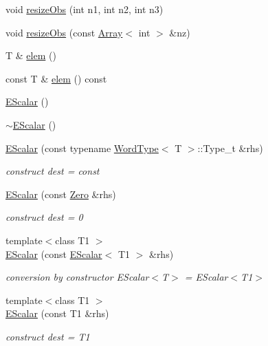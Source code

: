 \begin{DoxyCompactItemize}
\item 
void \mbox{\hyperlink{classENSEM_1_1EScalar_a1849b1cf66ab1a983ca9e1f268afd109}{resize\+Obs}} (int n1, int n2, int n3)
\item 
void \mbox{\hyperlink{classENSEM_1_1EScalar_a9273a529024099effecf6962eafa044e}{resize\+Obs}} (const \mbox{\hyperlink{classXMLArray_1_1Array}{Array}}$<$ int $>$ \&nz)
\item 
T \& \mbox{\hyperlink{classENSEM_1_1EScalar_a8de3b840367731efc862fc6943119152}{elem}} ()
\item 
const T \& \mbox{\hyperlink{classENSEM_1_1EScalar_ab3fb9173e700cc3e0bf94ffcb9d04c29}{elem}} () const
\item 
\mbox{\hyperlink{classENSEM_1_1EScalar_ad4290141b2f7d43b6652d8ef95dfdbf5}{E\+Scalar}} ()
\item 
\mbox{\hyperlink{classENSEM_1_1EScalar_addb090b46c2b6abdff79eb52bad58091}{$\sim$\+E\+Scalar}} ()
\item 
\mbox{\hyperlink{classENSEM_1_1EScalar_ad064adaa15e67106893182ba57c6fd91}{E\+Scalar}} (const typename \mbox{\hyperlink{structENSEM_1_1WordType}{Word\+Type}}$<$ T $>$\+::Type\+\_\+t \&rhs)
\begin{DoxyCompactList}\small\item\em construct dest = const \end{DoxyCompactList}\item 
\mbox{\hyperlink{classENSEM_1_1EScalar_aa50915f887b0e206aecad55b2f25e4de}{E\+Scalar}} (const \mbox{\hyperlink{structENSEM_1_1Zero}{Zero}} \&rhs)
\begin{DoxyCompactList}\small\item\em construct dest = 0 \end{DoxyCompactList}\item 
{\footnotesize template$<$class T1 $>$ }\\\mbox{\hyperlink{classENSEM_1_1EScalar_a62e800e98a28c98a6d297eb613e86f82}{E\+Scalar}} (const \mbox{\hyperlink{classENSEM_1_1EScalar}{E\+Scalar}}$<$ T1 $>$ \&rhs)
\begin{DoxyCompactList}\small\item\em conversion by constructor E\+Scalar$<$\+T$>$ = E\+Scalar$<$\+T1$>$ \end{DoxyCompactList}\item 
{\footnotesize template$<$class T1 $>$ }\\\mbox{\hyperlink{classENSEM_1_1EScalar_a1436a0e5b8bf00083caf1540f4fc9397}{E\+Scalar}} (const T1 \&rhs)
\begin{DoxyCompactList}\small\item\em construct dest = T1 \end{DoxyCompactList}\item 

\end{DoxyCompactItemize}
